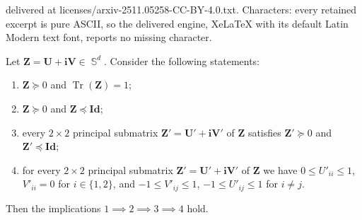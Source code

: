 \documentclass[10pt,a4paper]{amsart}
\DeclareMathOperator{\herm}{\mathbb{S}}
\DeclareMathOperator{\tr}{Tr}
\newcommand{\Id}{\mathbf{Id}}
\newcommand{\U}{\mathbf{U}}
\newcommand{\V}{\mathbf{V}}
\newcommand{\Z}{\mathbf{Z}}
\newcommand{\vi}{\mathbf{i}}
\begin{document}
delivered at licenses/arxiv-2511.05258-CC-BY-4.0.txt. Characters: every retained excerpt is pure ASCII, so the delivered engine, XeLaTeX with its default Latin Modern text font, reports no missing character.
\begin{theorem}
\label{thm.implication}
Let $\Z = \U + \vi \V \in \herm^d$. Consider the following statements:
\begin{enumerate}
    \item $\Z \succeq 0$ and $\tr(\Z) = 1$;
    \item $\Z \succeq 0$ and $\Z \preceq \Id$;
    \item every $2\times2$ principal submatrix $\Z' = \U' + \vi \V'$ of $\Z$ satisfies $\Z' \succeq 0$ and $\Z' \preceq \Id$;
    \item for every $2\times2$ principal submatrix $\Z' = \U' + \vi \V'$ of $\Z$ we have $0 \le U'_{ii} \le 1$, $V'_{ii} = 0$ for $i\in\{1,2\}$, and $-1 \le V'_{ij} \le 1$, $-1 \le U'_{ij} \le 1$ for $i\ne j$.
\end{enumerate}
Then the implications $1 \implies 2 \implies 3 \implies 4$ hold.
\end{theorem}
\end{document}
